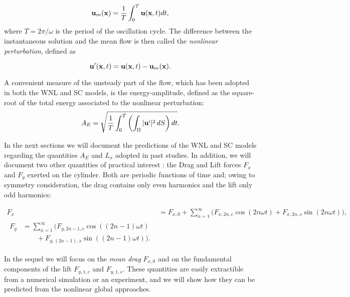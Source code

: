 \documentclass[twocolumn,10pt]{asme2ej}
\newcommand{\be}[1]{ \begin{equation} \label{#1}}
\newcommand{\ee}{\end{equation}}
\begin{document}
\be{defumean}
{\bf u}_m({\bf x})  = \frac{1}{T} \int_0^{T}  {\bf u}({\bf x},t)  dt,
\ee
where $T = 2\pi/\omega$  is the period of the oscillation cycle. The difference between the instantaneous solution and the mean flow is then called the {\em nonlinear perturbation}, defined as 

\be{defuprime}
{\bf u}'({\bf x},t) =   {\bf u}({\bf x},t)-  {\bf u}_m({\bf x}).
\ee

A convenient measure of the unsteady part of the flow, which has been adopted in both the WNL and SC models, is the energy-amplitude, defined as the square-root of the total energy associated to the nonlinear perturbation:
\be{defAnergy}
A_E = \sqrt{\frac{1}{T} \int_0^{T} \left( \int_\Omega | {\bf u}' |^2 \, dS \right) dt}.
\ee

In the next sections we will document the predictions of the WNL and SC models regarding the quantities $A_E$ and $L_x$ adopted in past studies. In addition, we will document two other quantities of practical interest : the Drag and Lift forces $F_x$ and $F_y$ exerted on the cylinder. 
Both are periodic functions of time and; owing to symmetry consideration, the drag contains only even harmonics and the lift only odd harmonics:

\begin{align}
F_x &=F_{x,0} + \sum_{n=1}^\infty \big( F_{x,2n,c} \cos ( 2 n \omega t) + F_{x,2n,s} \sin( 2 n  \omega t ) \big),
\\
\begin{split}
F_y  & =\sum_{n=1}^\infty \big( F_{y,{2n-1},c} \cos ((2n-1) \omega t )\\
             &\qquad + F_{y,(2n-1),s}  \sin ((2n-1) \omega t) \big).
\end{split}
\label{drag_lift_def}
\end{align}



In the sequel we will focus on the {\em mean drag}  $F_{x,0}$ and on the fundamental components of the lift  
$F_{y,1,c}$ and $F_{y,1,s}$. These quantities are easily extractible from a numerical simulation or an experiment, and we will
show how they can be predicted from the nonlinear global approaches.
 
\end{document}
